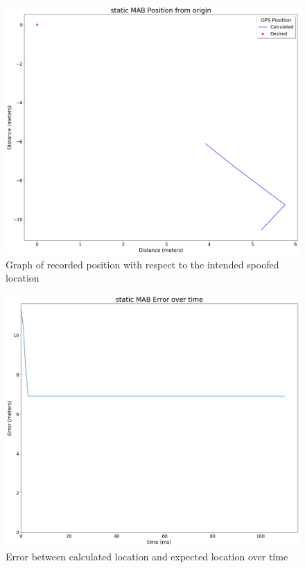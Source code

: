 \begin{figure}[h]
    \begin{centering}
        \includegraphics[width=14cm,keepaspectratio]{Figures/2021_3_30_static_MAB Position from origin.png}
        \caption{Graph of recorded position with respect to the intended spoofed location}
        \label{fig:MABStaticPosition}
    \end{centering}
\end{figure}

\begin{figure}[h]
    \begin{centering}
        \includegraphics[width=14cm,keepaspectratio]{Figures/2021_3_30_static_MAB error over time.png}
        \caption{Error between calculated location and expected location over time}
        \label{fig:MABStaticError}
    \end{centering}
\end{figure}

